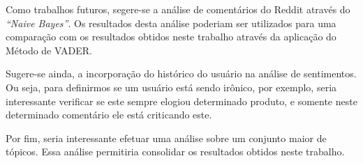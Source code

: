 Como trabalhos futuros, segere-se a análise de comentários do Reddit através
do \textit{``Naive Bayes''}. Os resultados desta análise poderiam ser utilizados
para uma comparação com os resultados obtidos neste trabalho através da
aplicação do Método de \ac{VADER}.

Sugere-se ainda, a incorporação do
histórico do usuário na análise de sentimentos. Ou seja, para definirmos se um
usuário está sendo irônico, por exemplo, seria interessante verificar se este
sempre elogiou determinado produto, e somente neste determinado comentário ele está criticando este.

Por fim, seria interessante efetuar uma análise sobre um conjunto maior de
tópicos. Essa análise permitiria consolidar os resultados obtidos neste
trabalho.
